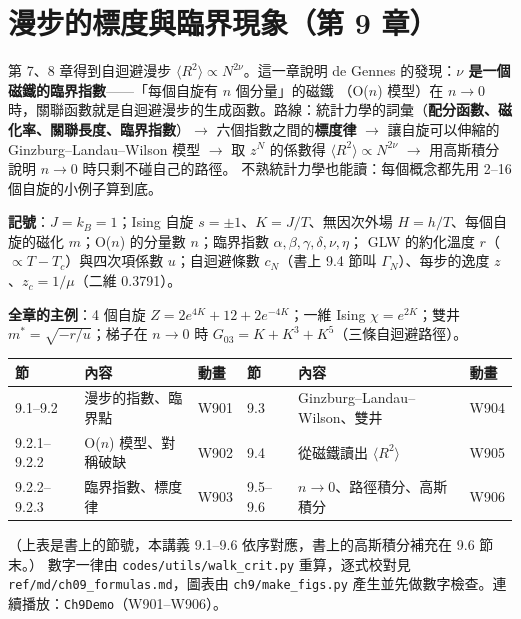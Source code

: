 

\section{漫步的標度與臨界現象（第 9 章）}

\begin{keybox}[先看這裡]
第 7、8 章得到自迴避漫步 $\langle R^2\rangle\propto N^{2\nu}$。這一章說明 de Gennes 的發現：\textbf{$\nu$ 是一個磁鐵的臨界指數}——「每個自旋有 $n$ 個分量」的磁鐵
（O($n$) 模型）在 $n\to0$ 時，關聯函數就是自迴避漫步的生成函數。路線：統計力學的詞彙（\textbf{配分函數、磁化率、關聯長度、臨界指數}）$\to$ 六個指數之間的\textbf{標度律}
$\to$ 讓自旋可以伸縮的 Ginzburg--Landau--Wilson 模型 $\to$ 取 $z^N$ 的係數得 $\langle R^2\rangle\propto N^{2\nu}$ $\to$ 用高斯積分說明 $n\to0$ 時只剩不碰自己的路徑。
不熟統計力學也能讀：每個概念都先用 2--16 個自旋的小例子算到底。

\textbf{記號}：$J=k_B=1$；Ising 自旋 $s=\pm1$、$K=J/T$、無因次外場 $H=h/T$、每個自旋的磁化 $m$；O($n$) 的分量數 $n$；臨界指數 $\alpha,\beta,\gamma,\delta,\nu,\eta$；
GLW 的約化溫度 $r$（$\propto T-T_c$）與四次項係數 $u$；自迴避條數 $c_N$（書上 9.4 節叫 $\Gamma_N$）、每步的逸度 $z$、$z_c=1/\mu$（二維 0.3791）。

\textbf{全章的主例}：4 個自旋 $Z=2e^{4K}+12+2e^{-4K}$；一維 Ising $\chi=e^{2K}$；雙井 $m^*=\sqrt{-r/u}$；梯子在 $n\to0$ 時 $G_{03}=K+K^3+K^5$（三條自迴避路徑）。
\begin{center}
\small
\begin{tabular}{@{}lll@{\qquad}lll@{}}
\toprule
節 & 內容 & 動畫 & 節 & 內容 & 動畫\\
\midrule
9.1--9.2 & 漫步的指數、臨界點 & W901 & 9.3 & Ginzburg--Landau--Wilson、雙井 & W904\\
9.2.1--9.2.2 & O($n$) 模型、對稱破缺 & W902 & 9.4 & 從磁鐵讀出 $\langle R^2\rangle$ & W905\\
9.2.2--9.2.3 & 臨界指數、標度律 & W903 & 9.5--9.6 & $n\to0$、路徑積分、高斯積分 & W906\\
\bottomrule
\end{tabular}
\end{center}
（上表是書上的節號，本講義 9.1--9.6 依序對應，書上的高斯積分補充在 9.6 節末。）
數字一律由 \texttt{codes/utils/walk\_crit.py} 重算，逐式校對見 \texttt{ref/md/ch09\_formulas.md}，圖表由 \texttt{ch9/make\_figs.py} 產生並先做數字檢查。連續播放：\texttt{Ch9Demo}（W901--W906）。
\end{keybox}

